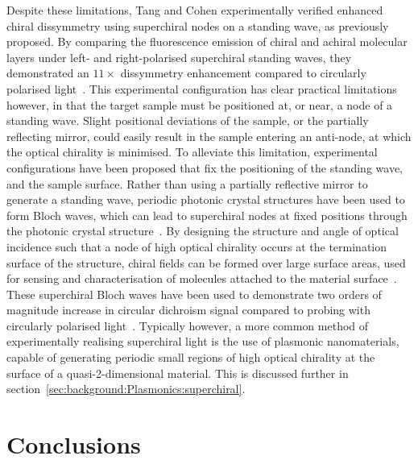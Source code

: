 Despite these limitations, Tang and Cohen experimentally verified enhanced chiral dissymmetry using superchiral nodes on a standing wave, as previously proposed. By comparing the fluorescence emission of chiral and achiral molecular layers under left- and right-polarised superchiral standing waves, they demonstrated an $11 \times$ dissymmetry enhancement compared to circularly polarised light~\cite{Tang2011}. This experimental configuration has clear practical limitations however, in that the target sample must be positioned at, or near, a node of a standing wave. Slight positional deviations of the sample, or the partially reflecting mirror, could easily result in the sample entering an anti-node, at which the optical chirality is minimised. To alleviate this limitation, experimental configurations have been proposed that fix the positioning of the standing wave, and the sample surface. Rather than using a partially reflective mirror to generate a standing wave, periodic photonic crystal structures have been used to form Bloch waves, which can lead to superchiral nodes at fixed positions through the photonic crystal structure~\cite{Sinibaldi2014, Pellegrini2017, Pellegrini2018}. By designing the structure and angle of optical incidence such that a node of high optical chirality occurs at the termination surface of the structure, chiral fields can be formed over large surface areas, used for sensing and characterisation of molecules attached to the material surface~\cite{Sinibaldi2014, Pellegrini2017}. These superchiral Bloch waves have been used to demonstrate two orders of magnitude increase in circular dichroism signal compared to probing with circularly polarised light~\cite{Pellegrini2017}.
Typically however, a more common method of experimentally realising superchiral light is the use of plasmonic nanomaterials, capable of generating periodic small regions of high optical chirality at the surface of a quasi-2-dimensional material. This is discussed further in section~\ref{sec:background:Plasmonics:superchiral}.


\section{Conclusions}

